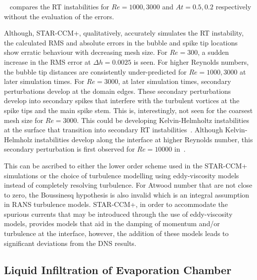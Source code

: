 ~ compares the RT instabilities for $Re = 1000, 3000$ and $At = 0.5, 0.2$ 
 respectively without the evaluation of the errors.

Although, STAR-CCM+, qualitatively, accurately simulates the RT instability, the calculated 
 RMS and absolute errors in the bubble and spike tip locations show erratic behaviour with decreasing mesh size. 
 For $Re = 300$, a sudden increase in the RMS error at $\Delta h = 0.0025$ is seen.
 For higher Reynolds numbers, the bubble tip distances are consistently under-predicted for $Re = 1000, 3000$ at
 later simulation times. For $Re = 3000$, at later simulation times, secondary perturbations develop at the domain edges.
 These secondary perturbations develop into secondary spikes that interfere with the turbulent vortices at the spike tips and the main spike stem. 
 This is, interestingly, not seen for the coarsest mesh size for $Re = 3000$.
 This could be developing Kelvin-Helmholtz instabilities at the surface that transition into secondary RT instabilities~\cite{chenEffectsInitialPerturbations2022}.
 Although Kelvin-Helmholz instabilities develop along the interface at higher Reynolds number, this secondary 
 perturbation is first observed for $Re = 10000$ in~\cite{hamzehlooDirectNumericalSimulations2021}.

This can be ascribed to either the lower order scheme used in the STAR-CCM+ simulations or the choice of 
 turbulence modelling using eddy-viscosity models instead of completely resolving turbulence. For Atwood number 
 that are not close to zero, the Boussinesq hypothesis is also invalid which is an integral assumption in 
 RANS turbulence models. STAR-CCM+, in order to accommodate the spurious currents that may be 
 introduced through the use of eddy-viscosity models, provides models that aid in the damping of momentum and/or 
 turbulence at the interface, however, the addition of these models leads to significant deviations from the DNS results.

\subsection{Liquid Infiltration of Evaporation Chamber}

